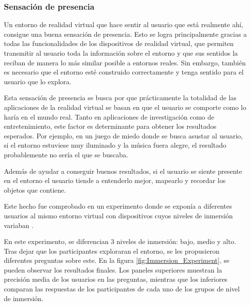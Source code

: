 \documentclass[../main.tex]{subfiles}
\begin{document}
\subsubsection{Sensación de presencia}

Un entorno de realidad virtual que hace sentir al usuario que está realmente ahí, consigue una buena sensación de presencia. Esto se logra principalmente gracias a todas las funcionalidades de los dispositivos de realidad virtual, que permiten transmitir al usuario toda la información sobre el entorno y que sus sentidos la reciban de manera lo más similar posible a entornos reales. Sin embargo, también es necesario que el entorno esté construido correctamente y tenga sentido para el usuario que lo explora.

Esta sensación de presencia se busca por que prácticamente la totalidad de las aplicaciones de la realidad virtual se basan en que el usuario se comporte como lo haría en el mundo real. Tanto en aplicaciones de investigación como de entretenimiento, este factor es determinante para obtener los resultados esperados. Por ejemplo, en un juego de miedo donde se busca asustar al usuario, si el entorno estuviese muy iluminado y la música fuera alegre, el resultado probablemente no sería el que se buscaba.

Además de ayudar a conseguir buenos resultados, si el usuario se siente presente en el entorno el usuario tiende a entenderlo mejor, mapearlo y recordar los objetos que contiene.

Este hecho fue comprobado en un experimento donde se exponía a diferentes usuarios al mismo entorno virtual con dispositivos cuyos niveles de inmersión variaban \cite{Immersion_Experiment}. 

En este experimento, se diferencian 3 niveles de inmersión: bajo, medio y alto. Tras dejar que los participantes exploraran el entorno, se les propusieron diferentes preguntas sobre este. En la figura \ref{fig:Immersion_Experiment}, se pueden observar los resultados finales. Los paneles superiores muestran la precisión media de los usuarios en las preguntas, mientras que los inferiores comparan las respuestas de los participantes de cada uno de los grupos de nivel de inmersión.
\end{document}
